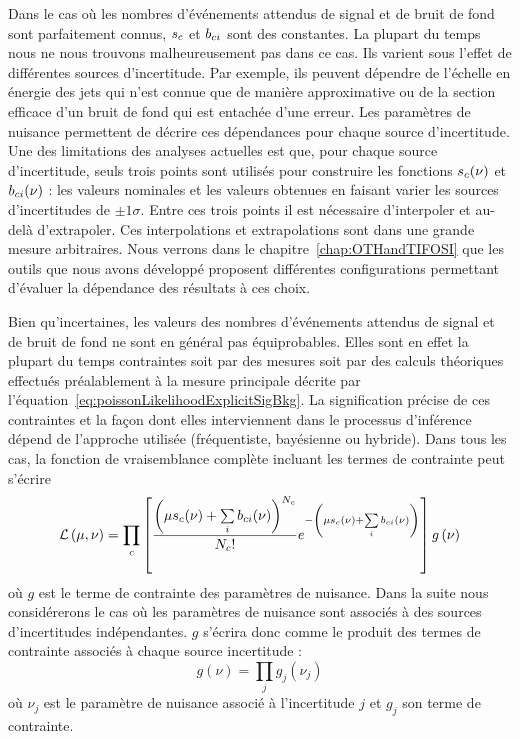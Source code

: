 Dans le cas où les nombres d'événements attendus de signal et de bruit de fond sont parfaitement connus, $s_c$ et $b_{ci}$ sont des constantes. La plupart du temps nous ne nous trouvons malheureusement pas dans ce cas. Ils varient sous l'effet de différentes sources d'incertitude. Par exemple, ils peuvent dépendre de l'échelle en énergie des jets qui n'est connue que de manière approximative ou de la section efficace d'un bruit de fond qui est entachée d'une erreur. Les paramètres de nuisance permettent de décrire ces dépendances pour chaque source d'incertitude. Une des limitations des analyses actuelles est que, pour chaque source d'incertitude, seuls trois points sont utilisés pour construire les fonctions $s_c(\nu)$ et $b_{ci}(\nu)$ : les valeurs nominales et les valeurs obtenues en faisant varier les sources d'incertitudes de $\pm 1\sigma$. Entre ces trois points il est nécessaire d'interpoler et au-delà d'extrapoler. Ces interpolations et extrapolations sont dans une grande mesure arbitraires. Nous verrons dans le chapitre~\ref{chap:OTHandTIFOSI} que les outils que nous avons développé proposent différentes configurations permettant d'évaluer la dépendance des résultats à ces choix.

Bien qu'incertaines, les valeurs des nombres d'événements attendus de signal et de bruit de fond ne sont en général pas équiprobables. Elles sont en effet la plupart du temps contraintes soit par des mesures soit par des calculs théoriques effectués préalablement à la mesure principale décrite par l'équation~\ref{eq:poissonLikelihoodExplicitSigBkg}. La signification précise de ces contraintes et la fa\c con dont elles interviennent dans le processus d'inférence dépend de l'approche utilisée (fréquentiste, bayésienne ou hybride). Dans tous les cas, la fonction de vraisemblance complète incluant les termes de contrainte peut s'écrire
\begin{equation}
\label{eq:poissonLikelihoodExplicitSigBkgWithConstraint}                                                                                                        
{\cal L}\left(\mu,\nu\right)=\prod\limits_c\left[\frac{\left(\mu s_c(\nu)+\sum\limits_i b_{ci}(\nu)\right)^{N_{c}}}{N_{c}!}e^{-\left(\mu s_c(\nu)+\sum\limits_i b_{ci}(\nu)\right)}\right]g\left(\nu\right)
\end{equation}
où $g$ est le terme de contrainte des paramètres de nuisance. Dans la suite nous considérerons le cas où les paramètres de nuisance sont associés à des sources d'incertitudes indépendantes. $g$ s'écrira donc comme le produit des termes de contrainte associés à chaque source incertitude :
\begin{equation}
\label{eq:constrainFactorization}
g\left(\nu\right)=\prod\limits_j g_j(\nu_j)
\end{equation}
où $\nu_j$ est le paramètre de nuisance associé à l'incertitude $j$ et $g_j$ son terme de contrainte.

